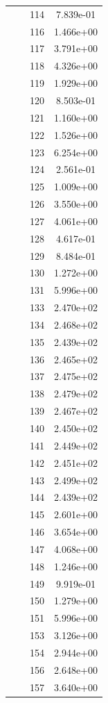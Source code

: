 \documentclass[12pt]{article}
\begin{document}
\begin{longtable}{@{}cccc@{}}
 &  & 114 & 7.839e-01 \\
 &  & 116 & 1.466e+00 \\
 &  & 117 & 3.791e+00 \\
 &  & 118 & 4.326e+00 \\
 &  & 119 & 1.929e+00 \\
 &  & 120 & 8.503e-01 \\
 &  & 121 & 1.160e+00 \\
 &  & 122 & 1.526e+00 \\
 &  & 123 & 6.254e+00 \\
 &  & 124 & 2.561e-01 \\
 &  & 125 & 1.009e+00 \\
 &  & 126 & 3.550e+00 \\
 &  & 127 & 4.061e+00 \\
 &  & 128 & 4.617e-01 \\
 &  & 129 & 8.484e-01 \\
 &  & 130 & 1.272e+00 \\
 &  & 131 & 5.996e+00 \\
 &  & 133 & 2.470e+02 \\
 &  & 134 & 2.468e+02 \\
 &  & 135 & 2.439e+02 \\
 &  & 136 & 2.465e+02 \\
 &  & 137 & 2.475e+02 \\
 &  & 138 & 2.479e+02 \\
 &  & 139 & 2.467e+02 \\
 &  & 140 & 2.450e+02 \\
 &  & 141 & 2.449e+02 \\
 &  & 142 & 2.451e+02 \\
 &  & 143 & 2.499e+02 \\
 &  & 144 & 2.439e+02 \\
 &  & 145 & 2.601e+00 \\
 &  & 146 & 3.654e+00 \\
 &  & 147 & 4.068e+00 \\
 &  & 148 & 1.246e+00 \\
 &  & 149 & 9.919e-01 \\
 &  & 150 & 1.279e+00 \\
 &  & 151 & 5.996e+00 \\
 &  & 153 & 3.126e+00 \\
 &  & 154 & 2.944e+00 \\
 &  & 156 & 2.648e+00 \\
 &  & 157 & 3.640e+00 \\

\end{longtable}
\end{document}
